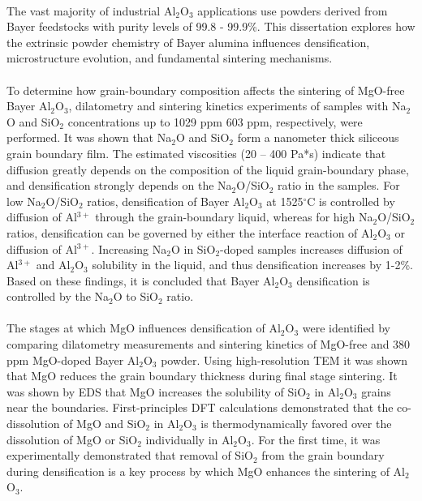 \paragraph*{} The vast majority of industrial Al$_{2}$O$_{3}$ applications use powders derived from Bayer feedstocks with purity levels of 99.8 - 99.9\%. This dissertation explores how the extrinsic powder chemistry of Bayer alumina influences densification, microstructure evolution, and fundamental sintering mechanisms.
\paragraph*{} To determine how grain-boundary composition affects the sintering of MgO-free Bayer Al$_{2}$O$_{3}$, dilatometry and sintering kinetics experiments of samples with Na$_{2}$O and SiO$_{2}$ concentrations up to 1029 ppm 603 ppm, respectively, were performed. It was shown that Na$_{2}$O and SiO$_{2}$ form a nanometer thick siliceous grain boundary film. The estimated viscosities (20 – 400 Pa*s) indicate that diffusion greatly depends on the composition of the liquid grain-boundary phase, and densification strongly depends on the Na$_{2}$O/SiO$_{2}$ ratio in the samples. For low Na$_{2}$O/SiO$_{2}$ ratios, densification of Bayer Al$_{2}$O$_{3}$ at 1525$^{\circ}$C is controlled by diffusion of Al$^{3+}$ through the grain-boundary liquid, whereas for high Na$_{2}$O/SiO$_{2}$ ratios, densification can be governed by either the interface reaction of Al$_{2}$O$_{3}$ or diffusion of Al$^{3+}$. Increasing Na$_{2}$O in SiO$_{2}$-doped samples increases diffusion of Al$^{3+}$ and Al$_{2}$O$_{3}$ solubility in the liquid, and thus densification increases by 1-2\%. Based on these findings, it is concluded that Bayer Al$_{2}$O$_{3}$ densification is controlled by the Na$_{2}$O to SiO$_{2}$ ratio. 
\paragraph*{} The stages at which MgO influences densification of Al$_{2}$O$_{3}$ were identified by comparing dilatometry measurements and sintering kinetics of MgO-free and 380 ppm MgO-doped Bayer Al$_{2}$O$_{3}$ powder. Using high-resolution TEM it was shown that MgO reduces the grain boundary thickness during final stage sintering. It was shown by EDS that MgO increases the solubility of SiO$_{2}$ in Al$_{2}$O$_{3}$ grains near the boundaries. First-principles DFT calculations demonstrated that the co-dissolution of MgO and SiO$_{2}$ in Al$_{2}$O$_{3}$ is thermodynamically favored over the dissolution of MgO or SiO$_{2}$ individually in Al$_{2}$O$_{3}$. For the first time, it was experimentally demonstrated that removal of SiO$_{2}$ from the grain boundary during densification is a key process by which MgO enhances the sintering of Al$_{2}$O$_{3}$. 
